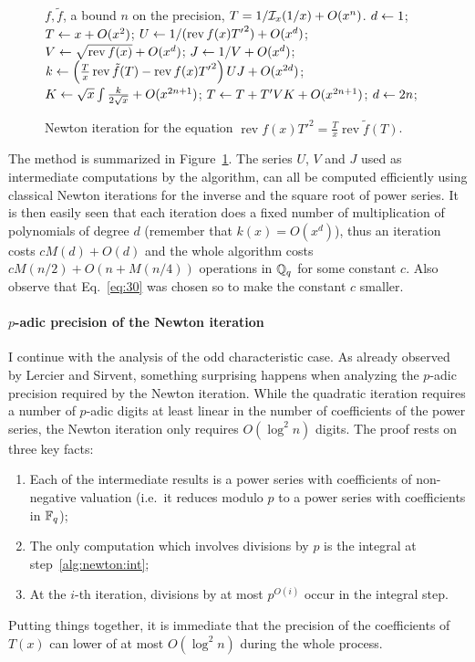 \documentclass{article}
\DeclareMathOperator{\rev}{rev}
\begin{document}
\begin{figure}
  \centering
  \begin{algorithmic}[1]
    \REQUIRE $f,\tilde f$, a bound $n$ on the precision,
    \ENSURE $T=1/\mathcal{I}_x(1/x) + O(x^n)$.
    \STATE $d \leftarrow 1$;
    \STATE $T \leftarrow x + O(x^2)$;
    \STATE $U \la 1/(\rev f(x){T'}^2) + O(x^d)$;
    \STATE $V \la \sqrt{\rev f(x)} + O(x^d)$;
    \STATE $J \leftarrow 1/V + O(x^d)$;
    \STATE $k \la \left(\frac{T}{x}\rev\tilde{f}(T) - \rev f(x){T'}^2\right)UJ + O(x^{2d})$;
    \STATE \label{alg:newton:int}$K \leftarrow \sqrt{x}\int\frac{k}{2\sqrt{x}} + O(x^{2n+1})$;
    \STATE $T \leftarrow T + T'VK + O(x^{2n+1})$;
    \STATE $d \leftarrow 2n$;
    \ENDWHILE
  \end{algorithmic}
  \caption{Newton iteration for the equation $\rev f(x){T'}^2=\frac{T}{x}\rev\tilde{f}(T)$.}
  \label{alg:newton}
\end{figure}

The method is summarized in Figure~\ref{alg:newton}.  The series $U$,
$V$ and $J$ used as intermediate computations by the algorithm, can
all be computed efficiently using classical Newton iterations for the
inverse and the square root of power series. It is then easily seen
that each iteration does a fixed number of multiplication of
polynomials of degree $d$ (remember that $k(x) = O(x^d)$), thus an
iteration costs $cM(d) + O(d)$ and the whole algorithm costs $cM(n/2)
+ O(n + M(n/4))$ operations in $\mathbb{Q}_q$ for some constant $c$. Also observe
that Eq.~\eqref{eq:30} was chosen so to make the constant $c$ smaller.

\paragraph{$p$-adic precision of the Newton iteration}
I continue with the analysis of the odd characteristic case. As
already observed by Lercier and Sirvent, something surprising happens
when analyzing the $p$-adic precision required by the Newton
iteration. While the quadratic iteration requires a number of $p$-adic
digits at least linear in the number of coefficients of the power
series, the Newton iteration only requires $O(\log^2 n)$ digits. The
proof rests on three key facts:
\begin{enumerate}
\item Each of the intermediate results is a power series with
  coefficients of non-negative valuation (i.e.\ it reduces modulo $p$
  to a power series with coefficients in $\mathbb{F}_q$);
\item The only computation which involves divisions by $p$ is the
  integral at step~\ref{alg:newton:int};
\item At the $i$-th iteration, divisions by at most $p^{O(i)}$
  occur in the integral step.
\end{enumerate}
Putting things together, it is immediate that the precision of the
coefficients of $T(x)$ can lower of at most $O(\log^2 n)$ during the
whole process.
\end{document}

